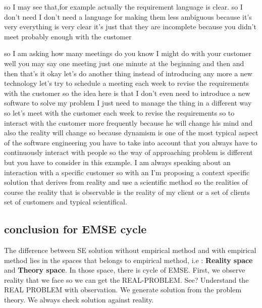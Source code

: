\documentclass[conference, compsoc, twoside]{IEEEtran}
\begin{document}
so I may see that,for example actually the requirement language is clear.
so I don't need I don't need a language for making them less ambiguous because it's very everything is very clear it's just that they are incomplete because you didn't meet probably enough with the customer 

so I am asking how many meetings do you know I might do with your customer well you may say one meeting just one minute at the beginning and then and then that's it okay let's do another thing instead of introducing any more a new technology let's try to schedule a meeting each week to revise the requirements with the customer so the idea here is that I don't even need to introduce a new software to solve my problem I just need to manage the thing in a different way so let's meet with the customer each week to revise the requirements so to interact with the customer more frequently because he will change his mind and also the reality will change so because dynamism is one of the most typical aspect of the software engineering you have to take into account that you always have to continuously interact with people so the way of approaching problem is different but you have to consider in this example.
I am always speaking about an interaction with a specific customer so with an I'm proposing a context specific solution that derives from reality and use a scientific method so the realities of course the reality that is observable is the reality of my client or a set of clients set of customers and typical scientifical. 

\subsection{conclusion for EMSE cycle} %
\label{sub:conclusion_for_emse_cycle}
The difference between SE solution without empirical method and with empirical method lies in the spaces that belongs to empirical method, i.e : 
\textbf{Reality space} and \textbf{Theory space}.
In those space, there is cycle of EMSE. 
First, we observe reality that we face so we can get the REAL-PROBLEM. See? Understand the REAL PROBLEM with observation. We generate  solution from the problem theory. We always check solution against reality.
\end{document}
